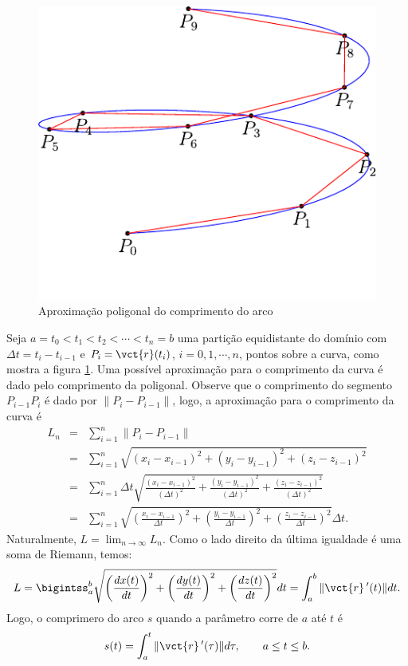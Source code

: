 \begin{figure}
\centering
    \includegraphics{./cap_curvas/figs/helice_retificacao}
\caption{Aproximação poligonal do comprimento do arco}\label{fig_compr_arc}
\end{figure}

 
 
Seja $a=t_0<t_1<t_2<\cdots<t_n=b $ uma partição equidistante do domínio com $\Delta t=t_i-t_{i-1}$ e $P_i=\vct{r}(t_i)$, $i=0,1,\cdots,n$, pontos sobre a curva, como mostra a figura \ref{fig_compr_arc}. Uma possível aproximação para o comprimento da curva é dado pelo comprimento da poligonal. Observe que o comprimento do segmento $P_{i-1}P_i$ é dado por $\|P_i-P_{i-1}\|$, logo, a aproximação para o comprimento da curva é
\begin{eqnarray*}
L_n&=&\sum_{i=1}^n\|P_i-P_{i-1}\|\\
&=&\sum_{i=1}^n \sqrt{(x_i-x_{i-1})^2+(y_i-y_{i-1})^2+(z_i-z_{i-1})^2}\\
&=&\sum_{i=1}^n \Delta t \sqrt{\frac{(x_i-x_{i-1})^2}{(\Delta t) ^2}+\frac{(y_i-y_{i-1})^2}{(\Delta t) ^2}+\frac{(z_i-z_{i-1})^2}{(\Delta t) ^2}}\\
&=&\sum_{i=1}^n \sqrt{\left(\frac{x_i-x_{i-1}}{\Delta t }\right)^2+\left(\frac{y_i-y_{i-1}}{\Delta t}\right)^2+\left(\frac{z_i-z_{i-1}}{\Delta t}\right)^2}\Delta t.
\end{eqnarray*}
Naturalmente, $L=\lim_{n\to\infty }L_n$. Como o lado direito da última igualdade é uma soma de Riemann, temos:
\begin{equation}\label{defcomparco}
L=\bigintss_{a}^{b} \sqrt{\left(\frac{dx(t)}{dt}\right)^2+\left(\frac{dy(t)}{dt}\right)^2+\left(\frac{dz(t)}{dt}\right)^2}dt=\int_{a}^{b}\|\vct{r}\!~'(t)\|dt.
\end{equation}
Logo, o comprimero do arco $s$ quando a parâmetro corre de $a$ até $t$ é
\begin{equation}\label{defcomparco_1}
s(t)=\int_{a}^{t}\|\vct{r}\!~'(\tau)\|d\tau,\qquad a\leq t\leq b.
\end{equation}

